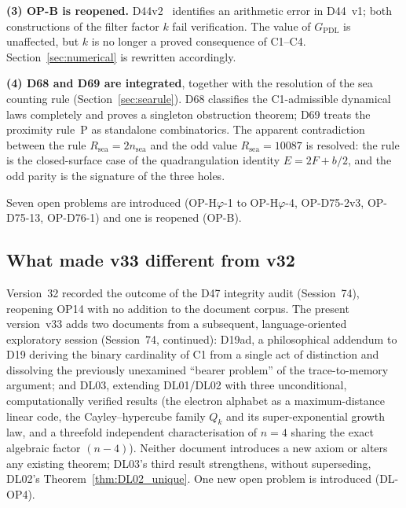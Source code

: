 \documentclass[11pt,a4paper]{article}
\newcommand{\Rsea}{R_{\mathrm{sea}}}
\theoremstyle{plain}
\theoremstyle{definition}
\theoremstyle{remark}
\begin{document}
\textbf{(3) OP-B is reopened.} D44v2~\cite{D44v2} identifies an arithmetic error in D44~v1; both constructions of the filter factor $k$ fail verification. The value of $G_{\mathrm{PDL}}$ is unaffected, but $k$ is no longer a proved consequence of C1--C4. Section~\ref{sec:numerical} is rewritten accordingly.

\textbf{(4) D68 and D69 are integrated}, together with the resolution of the sea counting rule (Section~\ref{sec:searule}). D68 classifies the C1-admissible dynamical laws completely and proves a singleton obstruction theorem; D69 treats the proximity rule~P as standalone combinatorics. The apparent contradiction between the rule $\Rsea=2n_{\mathrm{sea}}$ and the odd value $\Rsea=10087$ is resolved: the rule is the closed-surface case of the quadrangulation identity $E=2F+b/2$, and the odd parity is the signature of the three holes.

Seven open problems are introduced (OP-H$\varphi$-1 to OP-H$\varphi$-4, OP-D75-2v3, OP-D75-13, OP-D76-1) and one is reopened (OP-B).

\subsection{What made v33 different from v32}
\label{subsec:diffv32}
Version~32 recorded the outcome of the D47 integrity audit (Session~74), reopening OP14 with no addition to the document corpus. The present version~v33 adds two documents from a subsequent, language-oriented exploratory session (Session~74, continued): D19ad, a philosophical addendum to D19 deriving the binary cardinality of C1 from a single act of distinction and dissolving the previously unexamined ``bearer problem'' of the trace-to-memory argument; and DL03, extending DL01/DL02 with three unconditional, computationally verified results (the electron alphabet as a maximum-distance linear code, the Cayley--hypercube family $Q_k$ and its super-exponential growth law, and a threefold independent characterisation of $n=4$ sharing the exact algebraic factor $(n-4)$). Neither document introduces a new axiom or alters any existing theorem; DL03's third result strengthens, without superseding, DL02's Theorem~\ref{thm:DL02_unique}. One new open problem is introduced (DL-OP4).
\end{document}

